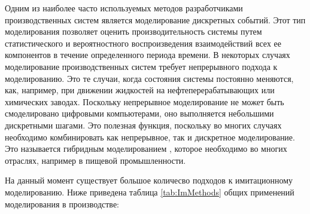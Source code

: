 Одним из наиболее часто используемых методов разработчиками производственных систем является моделирование дискретных событий. \cite{Detty} Этот тип моделирования позволяет оценить производительность системы путем статистического и вероятностного воспроизведения взаимодействий всех ее компонентов в течение определенного периода времени. В некоторых случаях моделирование производственных систем требует непрерывного подхода к моделированию. \cite{Robinson} Это те случаи, когда состояния системы постоянно меняются, как, например, при движении жидкостей на нефтеперерабатывающих или химических заводах. Поскольку непрерывное моделирование не может быть смоделировано цифровыми компьютерами, оно выполняется небольшими дискретными шагами. Это полезная функция, поскольку во многих случаях необходимо комбинировать как непрерывное, так и дискретное моделирование. Это называется гибридным моделированием \cite{inproceedings}, которое необходимо во многих отраслях, например в пищевой промышленности. \cite{Benedettini}

На данный момент существует большое количесво подходов к имитационному моделированию. Ниже приведена таблица \ref{tab:ImMethods} общих применений моделирования в производстве\cite{Jahangirian}:

